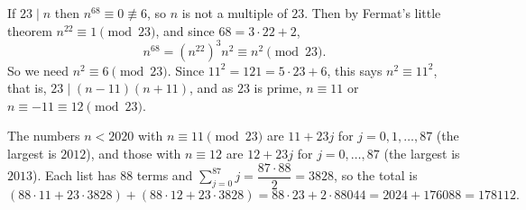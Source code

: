 If $23\mid n$ then $n^{68}\equiv0\not\equiv6$, so $n$ is not a multiple of $23$. Then by Fermat's little theorem $n^{22}\equiv1\pmod{23}$, and since $68=3\cdot22+2$,
\[n^{68}=\left(n^{22}\right)^3n^2\equiv n^2\pmod{23}.\]
So we need $n^2\equiv6\pmod{23}$. Since $11^2=121=5\cdot23+6$, this says $n^2\equiv11^2$, that is, $23\mid(n-11)(n+11)$, and as $23$ is prime, $n\equiv11$ or $n\equiv-11\equiv12\pmod{23}$.

The numbers $n<2020$ with $n\equiv11\pmod{23}$ are $11+23j$ for $j=0,1,\dots,87$ (the largest is $2012$), and those with $n\equiv12$ are $12+23j$ for $j=0,\dots,87$ (the largest is $2013$). Each list has $88$ terms and $\sum_{j=0}^{87}j=\dfrac{87\cdot88}{2}=3828$, so the total is
\[(88\cdot11+23\cdot3828)+(88\cdot12+23\cdot3828)=88\cdot23+2\cdot88044=2024+176088=\boxed{178112}.\]
